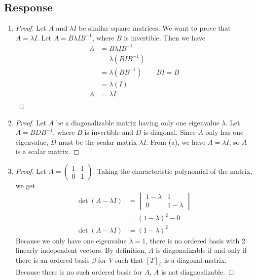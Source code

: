 \documentclass[13pt]{article}
\begin{document}
\subsection*{Response}
\begin{enumerate}[label=(\alph*),leftmargin=*]
\item
  \begin{proof}
    Let $A$ and $\lambda I$ be similar square matrices. We want to prove that $A = \lambda I$. Let $A = B\lambda IB^{-1}$, where $B$ is invertible. Then we have
    \begin{align*}
      A &= B\lambda IB^{-1} \\
        &= \lambda(BIB^{-1}) \\
        &= \lambda(BB^{-1}) && BI = B \\
        &= \lambda(I) \\
      A &= \lambda I \\
    \end{align*}
  \end{proof}
\item
  \begin{proof}
    Let $A$ be a diagonalizable matrix having only one eigenvalue $\lambda$. Let $A = BDB^{-1}$, where $B$ is invertible and $D$ is diagonal. Since $A$ only has one eigenvalue, $D$ must be the scalar matrix $\lambda I$. From (a), we have $A = \lambda I$, so $A$ is a scalar matrix.
  \end{proof}
\item
  \begin{proof}
    Let $A =
    \begin{pmatrix}
      1 & 1 \\
      0 & 1
    \end{pmatrix}$. Taking the characteristic polynomial of the matrix, we get
    \begin{align*}
      \det(A - \lambda I) &=
                            \begin{vmatrix}
                              1 - \lambda & 1 \\
                              0 & 1 - \lambda
                            \end{vmatrix} \\
                          &= (1 - \lambda)^2 - 0 \\
      \det(A - \lambda I) &= (1 - \lambda)^2
    \end{align*}
    Because we only have one eigenvalue $\lambda = 1$, there is no ordered basis with 2 linearly independent vectors. By definition, $A$ is diagonalizable if and only if there is an ordered basis $\beta$ for $V$ such that $[T]_\beta$ is a diagonal matrix. Because there is no such ordered basis for $A$, $A$ is not diagnoalizable.    
  \end{proof}
\end{enumerate}
\end{document}
